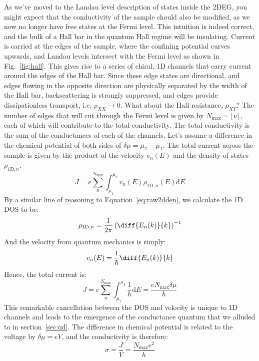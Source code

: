 As we've moved to the Landau level description of states inside the 2DEG, you might expect that the conductivity of the sample should also
be modified, as we now no longer have free states at the Fermi level. This intuition is indeed correct, and the bulk of a Hall bar in the quantum
Hall regime will be insulating. Current is carried at the edges of the sample, where the confining potential curves upwards, and Landau levels
intersect with the Fermi level\cite{PhysRevB.25.2185} as shown in Fig.~\ref{fig:hall}. This gives rise to a series of chiral, 1D channels that carry current around the edges
of the Hall bar. Since these edge states are directional, and edges flowing in the opposite direction are physically separated by the width of the Hall
bar, backscattering is strongly suppressed, and edges provide dissipationless transport, i.e. $\rho_{XX} \rightarrow 0$. What about
the Hall resistance, $\rho_{XY}$? The number of edges that will cut through the Fermi level is given by $N_\textrm{max} = \lfloor \nu \rfloor$, each of which
will contribute to the total conductivity. The total conductivity is the sum of the conductances of each of the channels. Let's assume a difference in the
chemical potential of both sides of $\delta \mu = \mu_2 - \mu_1$. The total current across the sample is given by the product of the velocity $v_n(E)$ and the density of states $\rho_{\textrm{1D},n}$.
\begin{equation}
  J = e\sum_n^{N_{\textrm{max}}} \int_{\mu_1}^{\mu_2} v_n(E)\rho_{\textrm{1D},n}(E) \mathrm{d}E
\end{equation}
By a similar line of reasoning to Equation~\ref{eq:raw2dden}, we calculate the 1D DOS to be:
\begin{equation}
  \rho_{\textrm{1D},n} = \frac{1}{2\pi}\left(\diff{E_n(k)}{k}\right)^{-1}
\end{equation}
And the velocity from quantum mechanics is simply:
\begin{equation}
  v_n(E) = \frac{1}{\hbar}\diff{E_n(k)}{k}
\end{equation}
Hence, the total current is:
\begin{equation}
  J = e\sum_n^{N_{\textrm{max}}} \int_{\mu_1}^{\mu_2} \frac{1}{h} \mathrm{d}E = \frac{e N_{\textrm{max}} \delta\mu}{h}
\end{equation}
This remarkable cancellation between the DOS and velocity is unique to 1D channels and leads to the emergence of the conductance quantum that
we alluded to in section~\ref{sec:qd}. The difference in chemical potential is related to the voltage by $\delta \mu = eV$, and the conductivity is therefore:
\begin{equation}
  \sigma = \frac{J}{V} = \frac{N_{\textrm{max}} e^2}{h}
  \label{eq:hallsigma}
\end{equation}


